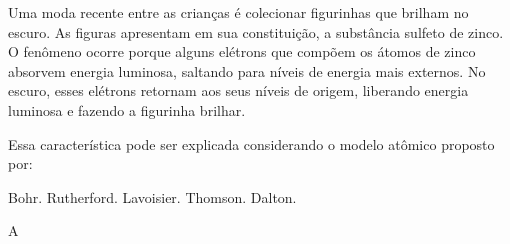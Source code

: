 \documentclass[11pt]{article}
\begin{document}
\begin{exercise}
Uma moda recente entre as crianças é colecionar figurinhas que brilham no escuro. As figuras apresentam em sua constituição, a substância sulfeto de zinco. O fenômeno ocorre porque alguns elétrons que compõem os átomos de zinco absorvem energia luminosa, saltando para níveis de energia mais externos. No escuro, esses elétrons retornam aos seus níveis de origem, liberando energia luminosa e fazendo a figurinha brilhar.

Essa característica pode ser explicada considerando o modelo atômico proposto por:

\begin{choice}
\choice Bohr.
\choice Rutherford.
\choice Lavoisier.
\choice Thomson.
\choice Dalton.
\end{choice}
\end{exercise}
\begin{solution}
A
\end{solution}
\end{document}

